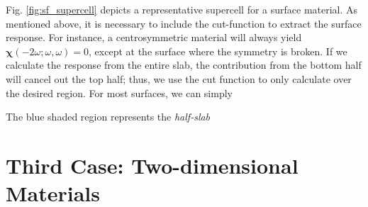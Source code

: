 \documentclass[letterpaper,10pt]{article}
\begin{document}
Fig. \ref{fig:sf_supercell} depicts a representative supercell for a surface material. As mentioned above, it is necessary to include the cut-function to extract the surface response. For instance, a centrosymmetric material will always yield $\boldsymbol{\chi}(-2\omega;\omega,\omega) = 0$, except at the surface where the symmetry is broken. If we calculate the response from the entire slab, the contribution from the bottom half will cancel out the top half; thus, we use the cut function to only calculate over the desired region. For most surfaces, we can simply 

The blue shaded region represents the \emph{half-slab}


\section*{Third Case: Two-dimensional Materials}
\end{document}
